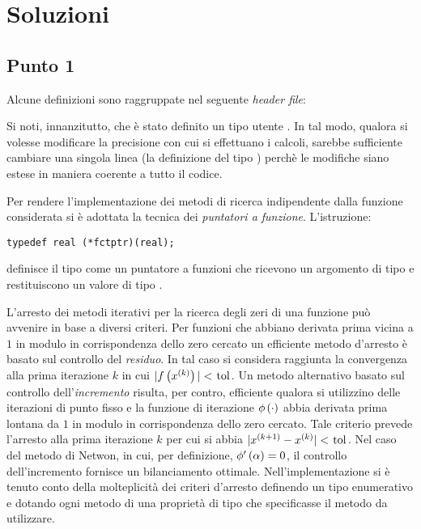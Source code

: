 \newpage

\section*{Soluzioni}

\subsection*{Punto 1}
Alcune definizioni sono raggruppate nel seguente \emph{header file}:
%
\lstset{basicstyle=\scriptsize\sf}

\lstset{basicstyle=\sf}

Si noti, innanzitutto, che \`e stato definito un tipo utente
. In tal modo, qualora si volesse modificare la precisione
con cui si effettuano i calcoli, sarebbe sufficiente cambiare una
singola linea (la definizione del tipo ) perch\`e le
modifiche siano estese in maniera coerente a tutto il codice.

Per rendere l'implementazione dei metodi di ricerca indipendente dalla
funzione considerata si \`e adottata la tecnica dei \emph{puntatori a
funzione}. L'istruzione: 
\begin{lstlisting}
typedef real (*fctptr)(real);
\end{lstlisting}
definisce il tipo  come un puntatore a funzioni che
ricevono un argomento di tipo  e restituiscono un valore di
tipo .

L'arresto dei metodi iterativi per la ricerca degli zeri di una
funzione pu\`o avvenire in base a diversi criteri. Per funzioni che
abbiano derivata prima vicina a $1$ in modulo in corrispondenza dello
zero cercato un efficiente metodo d'arresto \`e basato sul controllo
del \emph{residuo}. In tal caso si considera raggiunta la convergenza
alla prima iterazione $k$ in cui
$\module{\function{f}{x\iter{k}}}<\cpp{tol}$. Un metodo alternativo
basato sul controllo dell'\emph{incremento} risulta, per contro,
efficiente qualora si utilizzino delle iterazioni di punto fisso e la
funzione di iterazione $\phi\left( \cdot\right)$ abbia derivata prima
lontana da $1$ in modulo in corrispondenza dello zero cercato. Tale
criterio prevede l'arresto alla prima iterazione $k$ per cui si abbia
$\module{x\iter{k+1} - x\iter{k}}<\cpp{tol}$. Nel caso del metodo di
Netwon, in cui, per definizione, $\phi'\left( \alpha\right) = 0$, il
controllo dell'incremento fornisce un bilanciamento
ottimale. Nell'implementazione si \`e tenuto conto della
molteplicit\`a dei criteri d'arresto definendo un tipo enumerativo
 e dotando ogni metodo di una propriet\`a 
di tipo  che specificasse il metodo da utilizzare. 

